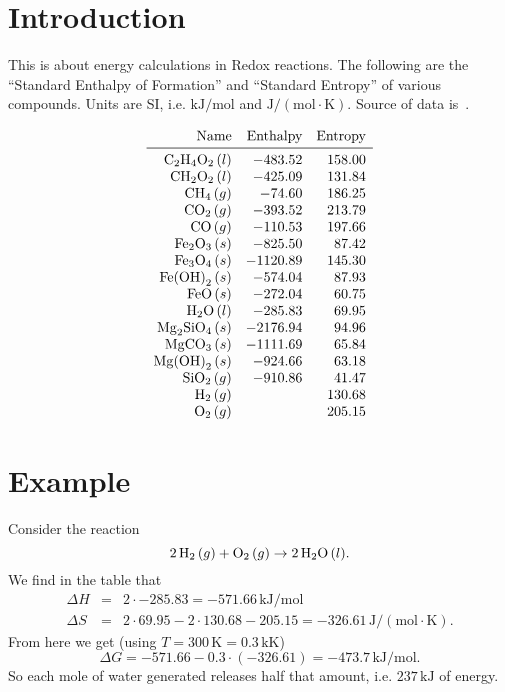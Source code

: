\documentclass[a4paper,14pt]{extarticle}
\def\H{{\rm H}}
\def\O{{\rm O}}
\def\C{{\rm C}}
\def\Fe{{\rm Fe}}
\def\Mg{{\rm Mg}}
\def\Si{{\rm Si}}
\begin{document}

\section{Introduction}

This is about energy calculations in Redox reactions.
The following are the ``Standard Enthalpy of Formation'' and ``Standard Entropy'' of
various compounds. Units are SI, i.e. $\text{kJ}/\text{mol}$ and $\text{J}/(\text{mol}\cdot \text{K})$.
Source of data is~\cite{nist}.

\[
\begin{array}{rrr}
    \text{Name}      & \text{Enthalpy} & \text{Entropy} \\
   \midrule
 \C_2\H_4\O_2 \,(l)  &  -483.52 & 158.00  \\
 \C\H_2\O_2 \,(l)    &  -425.09 & 131.84  \\
 \C\H_4 \,(g)        &   -74.60 & 186.25  \\
 \C\O_2 \,(g)        &  -393.52 & 213.79  \\
 \C\O \,(g)          &  -110.53 & 197.66  \\
 \Fe_2\O_3 \,(s)     &  -825.50 &  87.42  \\
 \Fe_3\O_4 \,(s)     & -1120.89 & 145.30  \\
 \Fe{(\O\H)}_2 \,(s) &  -574.04 &  87.93  \\
 \Fe\O \,(s)         &  -272.04 &  60.75  \\
 \H_2\O \,(l)        &  -285.83 &  69.95  \\
 \Mg_2\Si\O_4 \,(s)  & -2176.94 &  94.96  \\
 \Mg\C\O_3 \,(s)     & -1111.69 &  65.84  \\
 \Mg{(\O\H)}_2 \,(s) &  -924.66 &  63.18  \\
 \Si\O_2 \,(g)       &  -910.86 &  41.47  \\
 \H_2 \,(g)          &          & 130.68  \\
 \O_2 \,(g)          &          & 205.15
\end{array}
\]

\section{Example}

Consider the reaction
\[
    2 \,\H_2 \,(g) + \O_2 \,(g) \rightarrow 2 \,\H_2\O \,(l).
\]
We find in the table that
\[
    \begin{array}{rcl}
        \Delta H &=& 2 \cdot -285.83 = -571.66 \,\text{kJ}/\text{mol} \\
        \Delta S &=& 2 \cdot 69.95 - 2 \cdot 130.68 - 205.15 = -326.61 \,\text{J}/(\text{mol}\cdot \text{K}).
    \end{array}
\]
From here we get (using $T = 300 \,\text{K} = 0.3 \,\text{kK}$)
\[
    \Delta G = -571.66 - 0.3 \cdot (-326.61) = -473.7 \,\text{kJ}/\text{mol}.
\]
So each mole of water generated releases half that amount, i.e. $237 \,\text{kJ}$ of energy.
\end{document}
